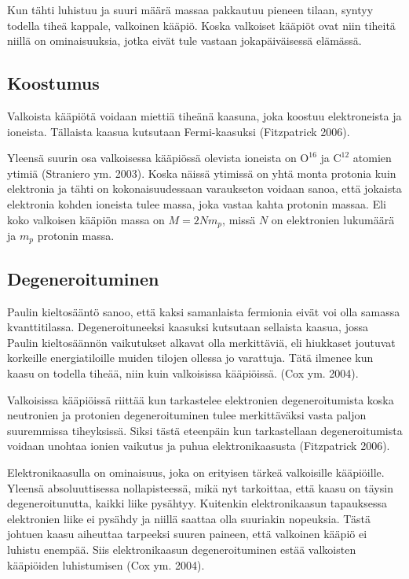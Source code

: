 \documentclass[12pt,a4paper,titlepage]{article}
\begin{document}
Kun tähti luhistuu ja suuri määrä massaa pakkautuu pieneen tilaan, syntyy todella tiheä kappale, valkoinen kääpiö. Koska valkoiset kääpiöt ovat niin tiheitä niillä on ominaisuuksia, jotka eivät tule vastaan jokapäiväisessä elämässä. 

\subsection{Koostumus}

Valkoista kääpiötä voidaan miettiä tiheänä kaasuna, joka koostuu elektroneista ja ioneista. Tällaista kaasua kutsutaan Fermi-kaasuksi (Fitzpatrick 2006). 

Yleensä suurin osa valkoisessa kääpiössä olevista ioneista on $\mathrm{O}^{16}$ ja $\mathrm{C}^{12}$ atomien ytimiä (Straniero ym. 2003). Koska näissä ytimissä on yhtä monta protonia kuin elektronia ja tähti on kokonaisuudessaan varaukseton voidaan sanoa, että jokaista elektronia kohden ioneista tulee massa, joka vastaa kahta protonin massaa. Eli koko valkoisen kääpiön massa on $ M = 2 N m_p $, missä $N$ on elektronien lukumäärä ja $m_p$ protonin massa.

\subsection{Degeneroituminen}

Paulin kieltosääntö sanoo, että kaksi samanlaista fermionia eivät voi olla samassa kvanttitilassa. Degeneroituneeksi kaasuksi kutsutaan sellaista kaasua, jossa Paulin kieltosäännön vaikutukset alkavat olla merkittäviä, eli hiukkaset joutuvat korkeille energiatiloille muiden tilojen ollessa jo varattuja. Tätä ilmenee kun kaasu on todella tiheää, niin kuin valkoisissa kääpiöissä. (Cox ym. 2004).

Valkoisissa kääpiöissä riittää kun tarkastelee elektronien degeneroitumista koska neutronien ja protonien degeneroituminen tulee merkittäväksi vasta paljon suuremmissa tiheyksissä. Siksi tästä eteenpäin kun tarkastellaan degeneroitumista voidaan unohtaa ionien vaikutus ja puhua elektronikaasusta (Fitzpatrick 2006).

Elektronikaasulla on ominaisuus, joka on erityisen tärkeä valkoisille kääpiöille. Yleensä absoluuttisessa nollapisteessä, mikä nyt tarkoittaa, että kaasu on täysin degeneroitunutta, kaikki liike pysähtyy. Kuitenkin elektronikaasun tapauksessa elektronien liike ei pysähdy ja niillä saattaa olla suuriakin nopeuksia. Tästä johtuen kaasu aiheuttaa tarpeeksi suuren paineen, että valkoinen kääpiö ei luhistu enempää. Siis elektronikaasun degeneroituminen estää valkoisten kääpiöiden luhistumisen (Cox ym. 2004).
\end{document}
